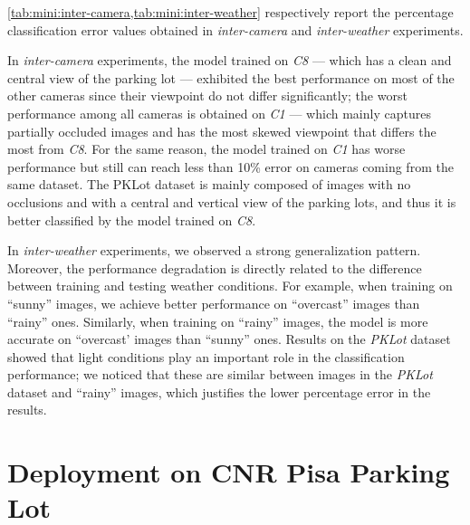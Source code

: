 \ref{tab:mini:inter-camera,tab:mini:inter-weather} respectively report the percentage classification error values obtained in \emph{inter-camera} and \emph{inter-weather} experiments.

In \emph{inter-camera} experiments, the model trained on \emph{C8} --- which has a clean and central view of the parking lot --- exhibited the best performance on most of the other cameras since their viewpoint do not differ significantly;
the worst performance among all cameras is obtained on \emph{C1} --- which mainly captures partially occluded images and has the most skewed viewpoint that differs the most from \emph{C8}.
For the same reason, the model trained on \emph{C1} has worse performance but still can reach less than 10\% error on cameras coming from the same dataset.
The PKLot dataset is mainly composed of images with no occlusions and with a central and vertical view of the parking lots, and thus it is better classified by the model trained on \emph{C8}.

In \emph{inter-weather} experiments, we observed a strong generalization pattern.
Moreover, the performance degradation is directly related to the difference between training and testing weather conditions.
For example, when training on ``sunny'' images, we achieve better performance on ``overcast'' images than ``rainy'' ones.
Similarly, when training on ``rainy'' images, the model is more accurate on ``overcast' images than ``sunny'' ones.
Results on the \emph{PKLot} dataset showed that light conditions play an important role in the classification performance;
we noticed that these are similar between images in the \emph{PKLot} dataset and ``rainy'' images, which justifies the lower percentage error in the results.

\section{Deployment on CNR Pisa Parking Lot}
\label{sec:mini:deployment}


